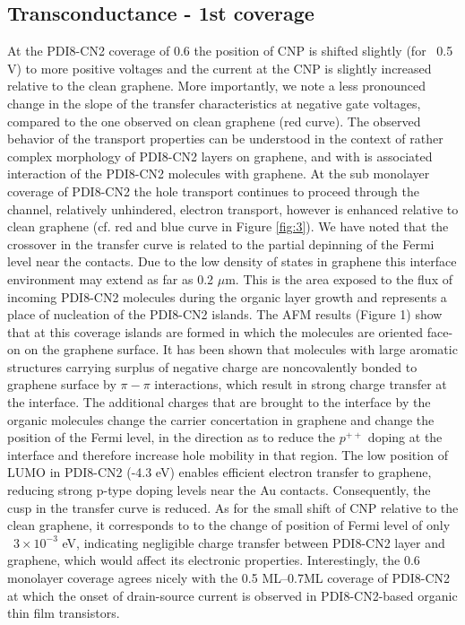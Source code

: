 \documentclass[preprint,aip,jap]{revtex4-2}
\begin{document}
\subsection{Transconductance - 1st coverage}
\label{sec:first}

At the PDI8-CN2 coverage of 0.6 the position of CNP is shifted slightly (for ~0.5 V)  to more positive voltages and the current at the CNP is slightly increased relative to the clean graphene.  More importantly, we note a less pronounced change in the slope of the transfer characteristics at negative gate voltages, compared to the one observed on clean graphene (red curve). The observed behavior of the transport properties can be understood in the context of rather complex morphology of PDI8-CN2 layers on graphene, and with is associated interaction of the PDI8-CN2 molecules with graphene. At the sub monolayer coverage of PDI8-CN2 the hole transport continues to proceed through the channel, relatively unhindered, electron transport, however is enhanced relative to clean graphene (cf. red and blue curve in Figure \ref{fig:3}). We have noted that the crossover in the transfer curve is related to the partial depinning of the Fermi level near the contacts. Due to the low density of states in graphene this interface environment may extend as far as 0.2 $\mu$m\cite{mueller-2009}. This is the area exposed to the flux of incoming PDI8-CN2 molecules during the organic layer growth and represents a place of nucleation of the PDI8-CN2 islands. The AFM results (Figure 1) show that at this coverage islands are formed in which the molecules are oriented face-on on the graphene surface. It has been shown\cite{su-2009} that molecules with large aromatic structures carrying surplus of negative charge are noncovalently bonded to graphene surface by $\pi-\pi$ interactions, which result in strong charge transfer at the interface. The additional charges that are brought to the interface by the organic molecules change the carrier concertation in graphene and change the position of the Fermi level, in the direction as to reduce the $p^{++}$ doping at the interface and therefore increase hole mobility in that region. The low position of LUMO in PDI8-CN2 (-4.3 eV)\cite{jones-2007} enables efficient electron transfer to graphene, reducing strong p-type doping levels near the Au contacts. Consequently, the cusp in the transfer curve is reduced.   As for the small shift of CNP relative to the clean graphene, it corresponds to to the change of position of Fermi level of only ~$3\times10^{-3}$ eV, indicating negligible charge transfer between PDI8-CN2 layer and graphene, which would affect its electronic properties. Interestingly, the 0.6 monolayer coverage agrees nicely with the 0.5 ML--0.7ML coverage of PDI8-CN2 at which the onset of  drain-source current is observed in PDI8-CN2-based organic thin film transistors\cite{liscio-2013}. 
\end{document}
